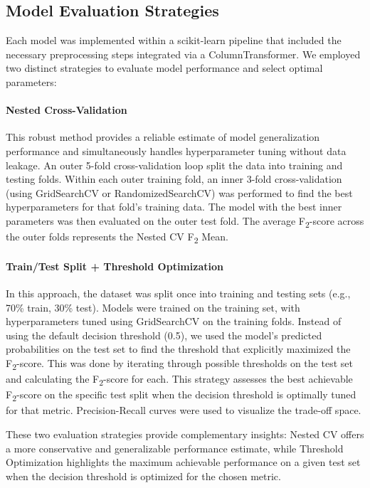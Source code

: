 \documentclass{article}
\begin{document}
\subsection{Model Evaluation Strategies}
\label{sec:evaluation_strategies} %

Each model was implemented within a scikit-learn pipeline that included the necessary preprocessing steps integrated via a ColumnTransformer. We employed two distinct strategies to evaluate model performance and select optimal parameters:

\paragraph{Nested Cross-Validation}
This robust method provides a reliable estimate of model generalization performance and simultaneously handles hyperparameter tuning without data leakage. An outer 5-fold cross-validation loop split the data into training and testing folds. Within each outer training fold, an inner 3-fold cross-validation (using GridSearchCV or RandomizedSearchCV) was performed to find the best hyperparameters for that fold's training data. The model with the best inner parameters was then evaluated on the outer test fold. The average F\textsubscript{2}-score across the outer folds represents the Nested CV F\textsubscript{2} Mean.

\paragraph{Train/Test Split + Threshold Optimization}
In this approach, the dataset was split once into training and testing sets (e.g., 70\% train, 30\% test). Models were trained on the training set, with hyperparameters tuned using GridSearchCV on the training folds. Instead of using the default decision threshold (0.5), we used the model's predicted probabilities on the test set to find the threshold that explicitly maximized the F\textsubscript{2}-score. This was done by iterating through possible thresholds on the test set and calculating the F\textsubscript{2}-score for each. This strategy assesses the best achievable F\textsubscript{2}-score on the specific test split when the decision threshold is optimally tuned for that metric. Precision-Recall curves were used to visualize the trade-off space.

These two evaluation strategies provide complementary insights: Nested CV offers a more conservative and generalizable performance estimate, while Threshold Optimization highlights the maximum achievable performance on a given test set when the decision threshold is optimized for the chosen metric.
\end{document}
